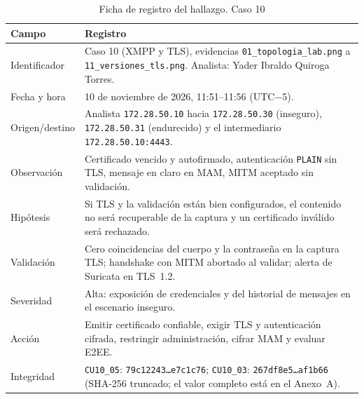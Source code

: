 \begin{table}[H]
	\centering
	\caption{Ficha de registro del hallazgo. Caso 10}
	\footnotesize
	\renewcommand{\arraystretch}{1.2}
	\begin{tabularx}{\textwidth}{@{}>{\raggedright\arraybackslash}p{} Y@{}}
		\toprule
		\textbf{Campo} & \textbf{Registro} \\ \midrule
		Identificador & Caso 10 (XMPP y TLS), evidencias \texttt{01\_topologia\_lab.png} a \texttt{11\_versiones\_tls.png}. Analista: Yader Ibraldo Quiroga Torres. \\ \hline
		Fecha y hora & 10 de noviembre de 2026, 11:51--11:56 (UTC$-$5). \\ \hline
		Origen/destino & Analista \texttt{172.28.50.10} hacia \texttt{172.28.50.30} (inseguro), \texttt{172.28.50.31} (endurecido) y el intermediario \texttt{172.28.50.10:4443}. \\ \hline
		Observación & Certificado vencido y autofirmado, autenticación \texttt{PLAIN} sin TLS, mensaje en claro en MAM, MITM aceptado sin validación. \\ \hline
		Hipótesis & Si TLS y la validación están bien configurados, el contenido no será recuperable de la captura y un certificado inválido será rechazado. \\ \hline
		Validación & Cero coincidencias del cuerpo y la contraseña en la captura TLS; handshake con MITM abortado al validar; alerta de Suricata en TLS~1.2. \\ \hline
		Severidad & Alta: exposición de credenciales y del historial de mensajes en el escenario inseguro. \\ \hline
		Acción & Emitir certificado confiable, exigir TLS y autenticación cifrada, restringir administración, cifrar MAM y evaluar E2EE. \\ \hline
		Integridad & \texttt{CU10\_05}: \texttt{79c12243\dots e7c1c76}; \texttt{CU10\_03}: \texttt{267df8e5\dots af1b66} (SHA-256 truncado; el valor completo está en el Anexo~A). \\
		\bottomrule
	\end{tabularx}
\end{table}
